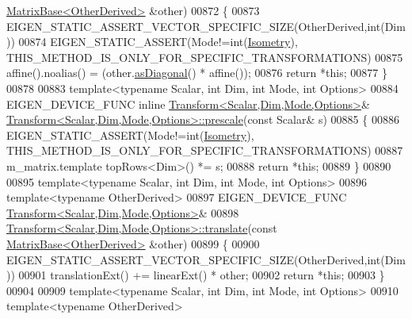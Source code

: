 \begin{DoxyCode}
      \hyperlink{group___core___module_class_eigen_1_1_matrix_base}{MatrixBase<OtherDerived>} &other)
00872 \{
00873   EIGEN\_STATIC\_ASSERT\_VECTOR\_SPECIFIC\_SIZE(OtherDerived,\textcolor{keywordtype}{int}(Dim))
00874   EIGEN\_STATIC\_ASSERT(Mode!=\textcolor{keywordtype}{int}(\hyperlink{group__enums_ggaee59a86102f150923b0cac6d4ff05107a080cd5366173608f701cd945c2335568}{Isometry}), THIS\_METHOD\_IS\_ONLY\_FOR\_SPECIFIC\_TRANSFORMATIONS)
00875   affine().noalias() = (other.\hyperlink{group___core___module_a14235b62c90f93fe910070b4743782d0}{asDiagonal}() * affine());
00876   \textcolor{keywordflow}{return} *\textcolor{keyword}{this};
00877 \}
00878 
00883 \textcolor{keyword}{template}<\textcolor{keyword}{typename} Scalar, \textcolor{keywordtype}{int} Dim, \textcolor{keywordtype}{int} Mode, \textcolor{keywordtype}{int} Options>
00884 EIGEN\_DEVICE\_FUNC \textcolor{keyword}{inline} \hyperlink{group___geometry___module_class_eigen_1_1_transform}{Transform<Scalar,Dim,Mode,Options>}& 
      \hyperlink{group___geometry___module_class_eigen_1_1_transform}{Transform<Scalar,Dim,Mode,Options>::prescale}(\textcolor{keyword}{const} Scalar& s)
00885 \{
00886   EIGEN\_STATIC\_ASSERT(Mode!=\textcolor{keywordtype}{int}(\hyperlink{group__enums_ggaee59a86102f150923b0cac6d4ff05107a080cd5366173608f701cd945c2335568}{Isometry}), THIS\_METHOD\_IS\_ONLY\_FOR\_SPECIFIC\_TRANSFORMATIONS)
00887   m\_matrix.template topRows<Dim>() *= s;
00888   \textcolor{keywordflow}{return} *\textcolor{keyword}{this};
00889 \}
00890 
00895 \textcolor{keyword}{template}<\textcolor{keyword}{typename} Scalar, \textcolor{keywordtype}{int} Dim, \textcolor{keywordtype}{int} Mode, \textcolor{keywordtype}{int} Options>
00896 \textcolor{keyword}{template}<\textcolor{keyword}{typename} OtherDerived>
00897 EIGEN\_DEVICE\_FUNC \hyperlink{group___geometry___module_class_eigen_1_1_transform}{Transform<Scalar,Dim,Mode,Options>}&
00898 \hyperlink{group___geometry___module_class_eigen_1_1_transform}{Transform<Scalar,Dim,Mode,Options>::translate}(\textcolor{keyword}{const} 
      \hyperlink{group___core___module_class_eigen_1_1_matrix_base}{MatrixBase<OtherDerived>} &other)
00899 \{
00900   EIGEN\_STATIC\_ASSERT\_VECTOR\_SPECIFIC\_SIZE(OtherDerived,\textcolor{keywordtype}{int}(Dim))
00901   translationExt() += linearExt() * other;
00902   \textcolor{keywordflow}{return} *\textcolor{keyword}{this};
00903 \}
00904 
00909 \textcolor{keyword}{template}<\textcolor{keyword}{typename} Scalar, \textcolor{keywordtype}{int} Dim, \textcolor{keywordtype}{int} Mode, \textcolor{keywordtype}{int} Options>
00910 \textcolor{keyword}{template}<\textcolor{keyword}{typename} OtherDerived>

\end{DoxyCode}
